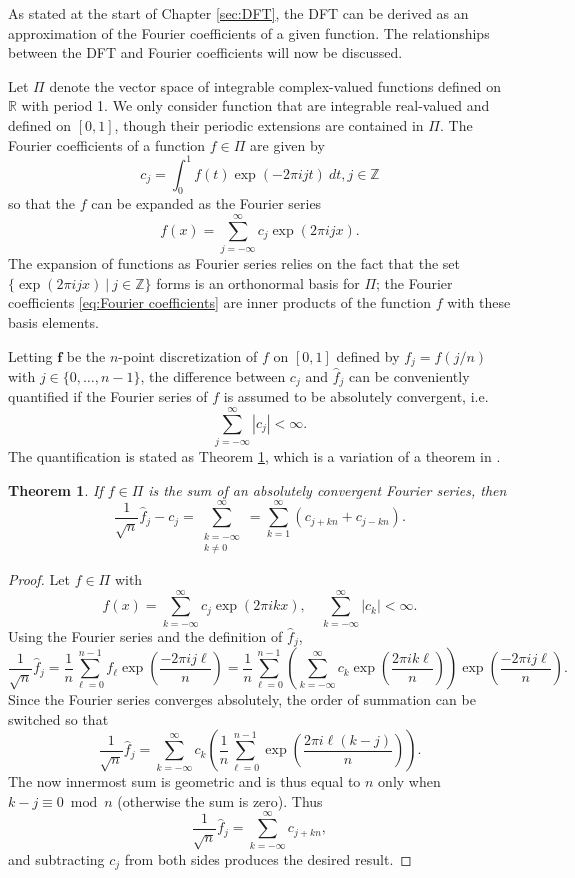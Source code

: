 \documentclass[12pt,notitlepage]{report}
\newtheorem{theorem}{Theorem}[section]
\begin{document}
As stated at the start of Chapter \ref{sec:DFT}, the DFT can be derived as an approximation of the Fourier coefficients of a given function. The relationships between the DFT and Fourier coefficients will now be discussed. \par 
Let $\Pi$ denote the vector space of integrable complex-valued functions defined on $\mathbb{R}$ with period 1. We only consider function that are integrable real-valued and defined on $[0,1]$, though their periodic extensions are contained in $\Pi$.  The Fourier coefficients of a function $f \in \Pi$ are given by 
\begin{equation}
\label{eq:Fourier coefficients}
c_j = \int_0^1 f(t)\exp(-2\pi{i}jt) \: dt, j \in \mathbb{Z}
\end{equation}
so that the $f$ can be expanded as the Fourier series
\begin{equation}
\label{eq:Fourier series}
f(x) = \sum_{j=-\infty}^{\infty} c_j \exp(2\pi{i}jx).
\end{equation}
The expansion of functions as Fourier series relies on the fact that the set $\{\exp(2\pi{i}jx)\:|\:j\in\mathbb{Z}\}$ forms is an orthonormal basis for $\Pi$; the Fourier coefficients \eqref{eq:Fourier coefficients} are inner products of the function $f$ with these basis elements. \par
Letting $\mathbf{f}$ be the $n$-point discretization of $f$ on $[0,1]$ defined by $f_j = f(j/n)$ with $j \in \{0,\ldots,n-1\}$, the difference between $c_j$ and $\widehat{f}_j$ can be conveniently quantified if the Fourier series of $f$ is assumed to be absolutely convergent, i.e.
\[\sum_{j=-\infty}^{\infty} |c_j| < \infty.\]
The quantification is stated as Theorem \ref{thm:Fourier accuracy}, which is a variation of a theorem in \cite[p.~19]{Henrici3}.
\begin{theorem}
\label{thm:Fourier accuracy}
If $f \in \Pi$ is the sum of an absolutely convergent Fourier series, then
\[\frac{1}{\sqrt{n}}\widehat{f}_j - c_j = \sum_{\substack{
k = -\infty \\
k \neq 0
}}^{\infty} = \sum_{k=1}^{\infty} (c_{j+k{n}} + c_{j-k{n}}).\]
\end{theorem}
\begin{proof}
Let $f \in \Pi$ with
\[f(x) = \sum_{k=-\infty}^{\infty} c_j \exp(2\pi{i}kx), \quad \sum_{k=-\infty}^{\infty} |c_k| < \infty.\]
Using the Fourier series and the definition of $\widehat{f}_j$,
\[\frac{1}{\sqrt{n}}\widehat{f}_j = \frac{1}{n}\sum_{\ell=0}^{n-1} f_{\ell}\exp\left(\frac{-2\pi{ij\ell}}{n}\right) = \frac{1}{n} \sum_{\ell=0}^{n-1} \left(\sum_{k=-\infty}^{\infty} c_k \exp\left(\frac{2\pi{i}k\ell}{n}\right)\right)\exp\left(\frac{-2\pi{ij\ell}}{n}\right).\]
Since the Fourier series converges absolutely, the order of summation can be switched so that
\[\frac{1}{\sqrt{n}}\widehat{f}_j = \sum_{k=-\infty}^{\infty} c_k \left(\frac{1}{n} \sum_{\ell=0}^{n-1} \exp\left(\frac{2\pi{i}\ell(k-j)}{n}\right)\right).\]
The now innermost sum is geometric and is thus equal to $n$ only when $k - j \equiv 0 \bmod n$ (otherwise the sum is zero). Thus
\[\frac{1}{\sqrt{n}}\widehat{f}_j = \sum_{k=-\infty}^{\infty} c_{j+kn},\]
and subtracting $c_j$ from both sides produces the desired result.
\end{proof}
\end{document}
